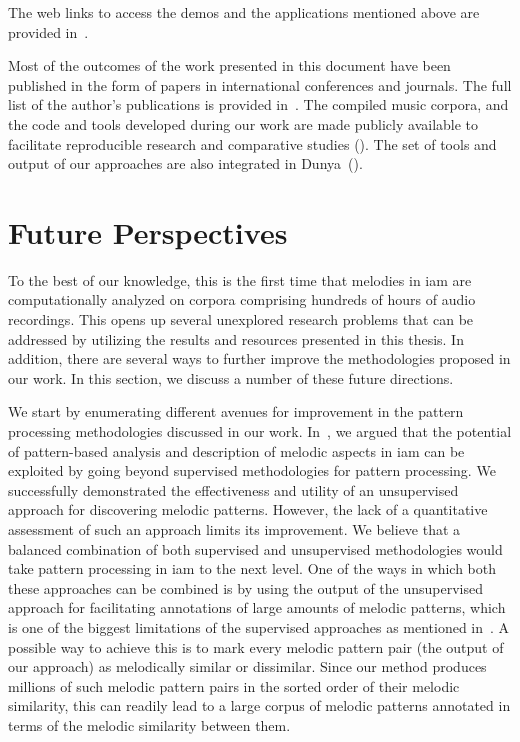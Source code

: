 The web links to access the demos and the applications mentioned above are provided in~.

Most of the outcomes of the work presented in this document have been published in the form of papers in international conferences and journals. The full list of the author’s publications is provided in~. The compiled music corpora, and the code and tools developed during our work are made publicly available to facilitate reproducible research and comparative studies (). The set of tools and output of our approaches are also integrated in Dunya~().


\section{Future Perspectives}
\label{sec:future_directions}

To the best of our knowledge, this is the first time that melodies in \gls{iam} are computationally analyzed on corpora comprising hundreds of hours of audio recordings. This opens up several unexplored research problems that can be addressed by utilizing the results and resources presented in this thesis. In addition, there are several ways to further improve the methodologies proposed in our work. In this section, we discuss a number of these future directions. 

We start by enumerating different avenues for improvement in the pattern processing methodologies discussed in our work. In~, we argued that the potential of pattern-based analysis and description of melodic aspects in \gls{iam} can be exploited by going beyond supervised methodologies for pattern processing. We successfully demonstrated the effectiveness and utility of an unsupervised approach for discovering melodic patterns. However, the lack of a quantitative assessment of such an approach limits its improvement. We believe that a balanced combination of both supervised and unsupervised methodologies would take pattern processing in \gls{iam} to the next level. One of the ways in which both these approaches can be combined is by using the output of the unsupervised approach for facilitating annotations of large amounts of melodic patterns, which is one of the biggest limitations of the supervised approaches as mentioned in~. A possible way to achieve this is to mark every melodic pattern pair (the output of our approach) as melodically similar or dissimilar. Since our method produces millions of such melodic pattern pairs in the sorted order of their melodic similarity, this can readily lead to a large corpus of melodic patterns annotated in terms of the melodic similarity between them.

